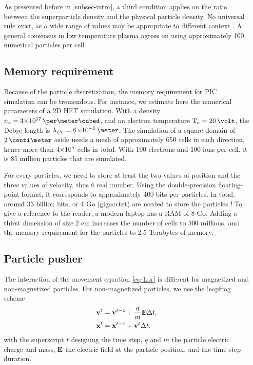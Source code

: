     As presented before in \cref{subsec-intro}, a third condition applies on the ratio between the superparticle density and the physical particle density. 
    No universal rule exist, as a wide range of values may be appropriate to different context \citep{turner2006,turner2013}.
    A general consensus in low temperature plasma agrees on using approximately 100 numerical particles per cell.
    
    \subsection{Memory requirement}
    Because of the particle discretization, the memory requirement for \ac{PIC} simulation can be tremendous.
    For instance, we estimate here the numerical parameters of a \ac{2D} \ac{HET} simulation.
    With a density $n_e = \sn{3}{17}\,\per\meter\cubed$, and an electron temperature $\Te=20\,\volt$, the Debye length is $\lde=\sn{6}{-5}\,\meter$.
    The simulation of a square domain of $2\,\centi\meter$ aside needs a mesh of approximately 650 cells in each direction, hence more than ${{4}{\times}10^{5}}$ cells in total.
    With 100 electrons and 100 ions per cell, it is 85 million particles that are simulated.
    
    For every particles, we need to store at least the two values of position and the three values of velocity, thus 6 real number.
    Using the double-precision floating-point format, it corresponds to approximately 400 bits per particles.
    In total, around 33 billion bits, or 4 Go (gigaoctet) are needed to store the particles ! 
    To give a reference to the reader, a modern laptop has a RAM of 8 Go.
    Adding a thirst dimension of size 2 cm increases the number of cells to 300 millions, and the memory requirement for the particles to 2.5 Terabytes of memory.
    
    
    \subsection{Particle pusher}
    The interaction of the movement equation \cref{eq-Lor} is different for magnetized and non-magnetized particles.
    For non-magnetized particles, we use the leapfrog scheme \cite{birdsall1991}
    \begin{align}\label{eq-leapfrog}
      {\mathbf v}^t &= {\mathbf v}^{t-1} + \frac{q}{m} {\mathbf E} \Delta t, \\
      {\mathbf x}^t &= {\mathbf x}^{t-1} + {\mathbf v}^t \Delta t,
    \end{align}
    with the superscript $t$ designing the time step, $q$ and $m$ the particle electric charge and mass, ${\mathbf E}$ the electric field at the particle position, and \dt the time step duration.

